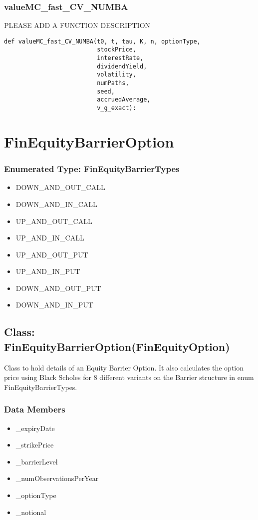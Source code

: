 \documentclass[twoside,11pt]{book}
\begin{document}
\subsubsection*{{\bf valueMC\_fast\_CV\_NUMBA}}
PLEASE ADD A FUNCTION DESCRIPTION

\begin{lstlisting}
def valueMC_fast_CV_NUMBA(t0, t, tau, K, n, optionType,
                          stockPrice,
                          interestRate,
                          dividendYield,
                          volatility,
                          numPaths,
                          seed,
                          accruedAverage,
                          v_g_exact):
\end{lstlisting}

\newpage
\section{FinEquityBarrierOption}

\subsubsection{Enumerated Type: FinEquityBarrierTypes}
\begin{itemize}
\item{DOWN\_AND\_OUT\_CALL}
\item{DOWN\_AND\_IN\_CALL}
\item{UP\_AND\_OUT\_CALL}
\item{UP\_AND\_IN\_CALL}
\item{UP\_AND\_OUT\_PUT}
\item{UP\_AND\_IN\_PUT}
\item{DOWN\_AND\_OUT\_PUT}
\item{DOWN\_AND\_IN\_PUT}
\end{itemize}

\subsection*{Class: FinEquityBarrierOption(FinEquityOption)}
Class to hold details of an Equity Barrier Option. It also calculates the option price using Black Scholes for 8 different variants on the Barrier structure in enum FinEquityBarrierTypes.  

\subsubsection*{Data Members}
\begin{itemize}
\item{\_expiryDate}
\item{\_strikePrice}
\item{\_barrierLevel}
\item{\_numObservationsPerYear}
\item{\_optionType}
\item{\_notional}
\end{itemize}
\end{document}
